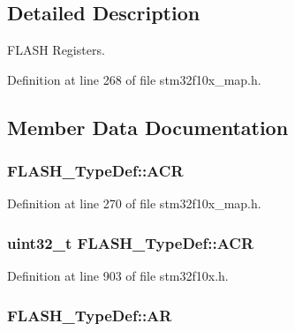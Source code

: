 \subsection{Detailed Description}
F\+L\+A\+SH Registers. 

Definition at line 268 of file stm32f10x\+\_\+map.\+h.



\subsection{Member Data Documentation}
\subsubsection[{\texorpdfstring{A\+CR}{ACR}}]{ F\+L\+A\+S\+H\+\_\+\+Type\+Def\+::\+A\+CR}\hypertarget{struct_f_l_a_s_h___type_def_aa1cc4da14ac887fbf7f6cef19179d8ba}{}\label{struct_f_l_a_s_h___type_def_aa1cc4da14ac887fbf7f6cef19179d8ba}


Definition at line 270 of file stm32f10x\+\_\+map.\+h.

\subsubsection[{\texorpdfstring{A\+CR}{ACR}}]{ {\bf uint32\+\_\+t} F\+L\+A\+S\+H\+\_\+\+Type\+Def\+::\+A\+CR}\hypertarget{struct_f_l_a_s_h___type_def_aaf432a8a8948613f4f66fcace5d2e5fe}{}\label{struct_f_l_a_s_h___type_def_aaf432a8a8948613f4f66fcace5d2e5fe}


Definition at line 903 of file stm32f10x.\+h.

\subsubsection[{\texorpdfstring{AR}{AR}}]{ F\+L\+A\+S\+H\+\_\+\+Type\+Def\+::\+AR}\hypertarget{struct_f_l_a_s_h___type_def_a162fff750708bbb533576ce52f30b64f}{}\label{struct_f_l_a_s_h___type_def_a162fff750708bbb533576ce52f30b64f}


